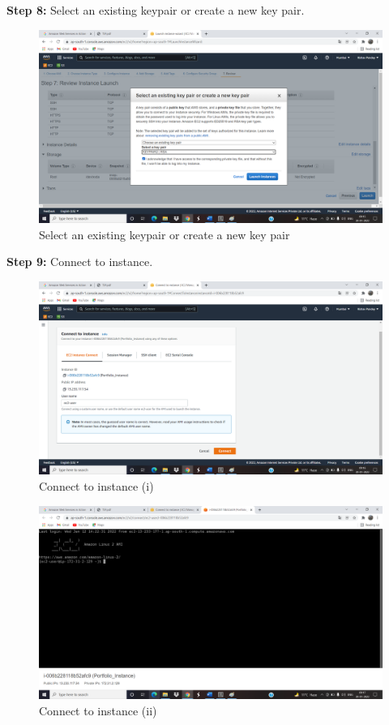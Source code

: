 \documentclass[12pt]{article}
\begin{document}
\textbf{Step 8:} Select an existing keypair or create a new key pair.
\begin{figure}[h]
\centering
\includegraphics[scale=0.265]{Untitled13.png}
\caption{Select an existing keypair or create a new key pair}
\label{Select an existing keypair or create a new key pair}
\end{figure}

\textbf{Step 9:} Connect to instance.
\begin{figure}[h]
\centering
\includegraphics[scale=0.265]{Untitled14.png}
\caption{Connect to instance (i)}
\label{Connect to instance (i)}
\end{figure}
\clearpage

\begin{figure}[h]
\centering
\includegraphics[scale=0.265]{Untitled15.png}
\caption{Connect to instance (ii)}
\label{Connect to instance (ii)}
\end{figure}
\end{document}
